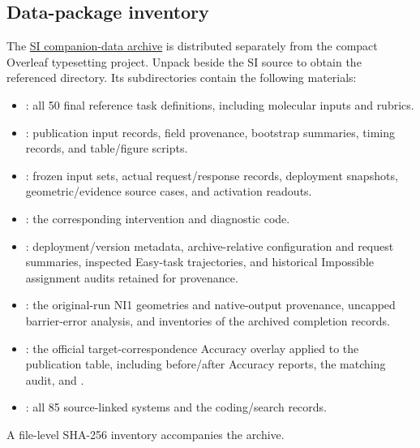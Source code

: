 \subsection{Data-package inventory}
The \href{https://drive.google.com/file/d/1lXNR6zhWTP2kJ1B5_-A9elXmblQX5ALf/view}{SI companion-data archive} is distributed separately from the compact Overleaf typesetting project. Unpack  beside the SI source to obtain the referenced  directory. Its subdirectories contain the following materials:
\begin{itemize}[nosep,leftmargin=1.5em]
\item {}: all 50 final reference task definitions, including molecular inputs and rubrics.
\item {}: publication input records, field provenance, bootstrap summaries, timing records, and table/figure scripts.
\item {}: frozen input sets, actual request/response records, deployment snapshots, geometric/evidence source cases, and activation readouts.
\item {}: the corresponding intervention and diagnostic code.
\item {}: deployment/version metadata, archive-relative configuration and request summaries, inspected Easy-task trajectories, and historical Impossible assignment audits retained for provenance.
\item {}: the original-run NI1 geometries and native-output provenance, uncapped barrier-error analysis, and inventories of the archived completion records.
\item {}: the official target-correspondence Accuracy overlay applied to the publication table, including before/after Accuracy reports, the matching audit, and .
\item {}: all 85 source-linked systems and the coding/search records.
\end{itemize}
A file-level SHA-256 inventory accompanies the archive.
